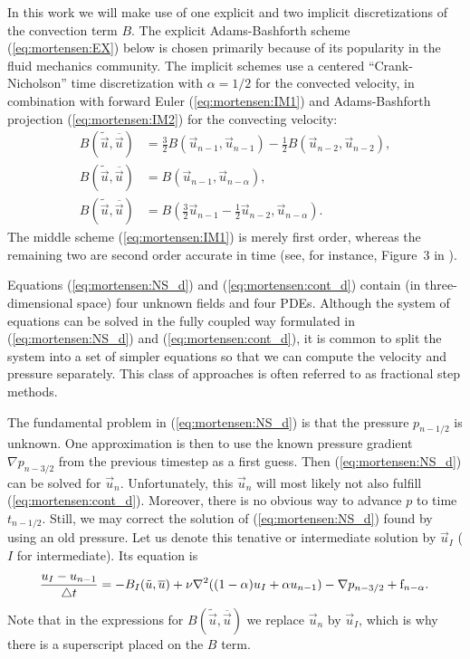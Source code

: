 In this work we will make use of one explicit and two
implicit discretizations of the convection term $B$. 
The explicit  Adams-Bashforth scheme
(\eqref{eq:mortensen:EX}) below is chosen primarily because of its
popularity in the fluid mechanics community. The implicit schemes use
a centered ``Crank-Nicholson'' time discretization with $\alpha=1/2$
for the convected velocity,
in combination with
forward
Euler (\eqref{eq:mortensen:IM1}) and Adams-Bashforth projection (\eqref{eq:mortensen:IM2}) for
the convecting velocity:
\begin{align}
\label{eq:mortensen:EX} 
B(\tilde{\vec{u}},\overline{\vec{u}}) &=
\frac{3}{2}B(\vec{u}_{n-1},\vec{u}_{n-1})-
\frac{1}{2}B(\vec{u}_{n-2},\vec{u}_{n-2}), \\
\label{eq:mortensen:IM1} 
B(\tilde{\vec{u}},\overline{\vec{u}}) &=
B(\vec{u}_{n-1},\vec{u}_{n-\alpha}), \\
 \label{eq:mortensen:IM2} 
B(\tilde{\vec{u}},\overline{\vec{u}}) &=
B(\frac{3}{2}\vec{u}_{n-1}-\frac{1}{2}\vec{u}_{n-2},\vec{u}_{n-\alpha}).
\end{align}
The middle scheme (\eqref{eq:mortensen:IM1}) is merely first order, 
whereas the remaining two are second order accurate in time 
(see, for instance, Figure~3 in \cite{simo94}).

Equations (\eqref{eq:mortensen:NS_d}) and (\eqref{eq:mortensen:cont_d}) contain (in
three-dimensional space) four unknown fields and four PDEs.
Although the system of equations can be solved in the fully coupled
way formulated in  (\eqref{eq:mortensen:NS_d}) and (\eqref{eq:mortensen:cont_d}),
it is common to split the system into a set of simpler equations
so that we can compute the velocity and pressure separately.
This class of approaches is often referred to as fractional step
methods.

The fundamental problem in (\eqref{eq:mortensen:NS_d}) is that the pressure
$p_{n-1/2}$ is unknown. One approximation is then to use the
known pressure gradient $\nabla p_{n-3/2}$ from the previous timestep as a first guess. Then (\eqref{eq:mortensen:NS_d}) can
be solved for $\vec{u}_n$. Unfortunately, this $\vec{u}_n$ will most 
likely not also fulfill
(\eqref{eq:mortensen:cont_d}). Moreover, there is no obvious way to advance $p$
to time $t_{n-1/2}$. Still, we may correct the solution of (\eqref{eq:mortensen:NS_d})
found by using an old pressure. Let us denote this tenative or
intermediate solution
by $\vec{u}_I$ ($I$ for intermediate). Its equation is
\begin{equation} 
\label{eq:mortensen:NS_FS} 
\frac{{\vec{u}}_{I}-\vec{u}_{n-1}}{\triangle t} = 
- B_I(\tilde{\vec{u}},\overline{\vec{u}}) + 
\nu \nabla^2 ((1-\alpha) {\vec{u}}_{I} + \alpha \vec{u}_{n-1}) 
-\nabla p_{n-3/2} + \text{f}_{n-\alpha} . \thinspace
\end{equation}
Note that in the expressions for $B(\tilde{\vec{u}},\overline{\vec{u}})$
we replace $\vec{u}_n$ by $\vec{u}_I$, which is why there is
a superscript placed on the $B$ term.


